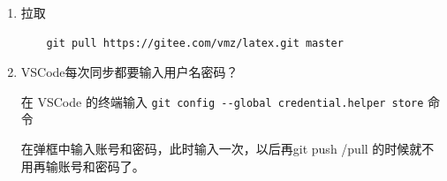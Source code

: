 \begin{enumerate}
  \begin{lstlisting}
    git remote add origin https://gitee.com/vmz/latex.git
  \end{lstlisting}
  \item 拉取
  
  \begin{lstlisting}
    git pull https://gitee.com/vmz/latex.git master
  \end{lstlisting}
  \item VSCode每次同步都要输入用户名密码？
  
  在 VSCode 的终端输入 \verb|git config --global credential.helper store| 命令

  在弹框中输入账号和密码，此时输入一次，以后再git push /pull 的时候就不用再输账号和密码了。
\end{enumerate}


